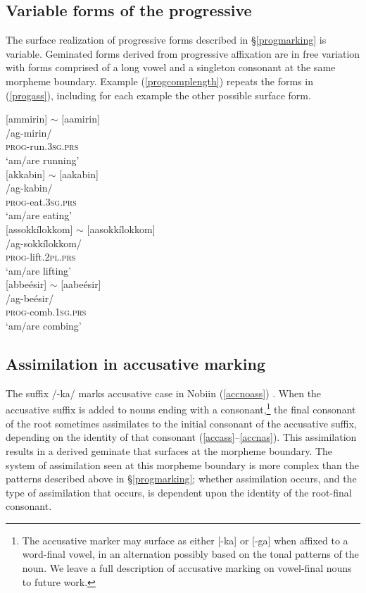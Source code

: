 \documentclass[output=paper]{langscibook}
\begin{document}
\subsection{Variable forms of the progressive}

The surface realization of progressive forms described in \S \ref{progmarking} is variable. Geminated forms derived from progressive affixation are in free variation with forms comprised of a long vowel and a singleton consonant at the same morpheme boundary. Example (\ref{progcomplength}) repeats the forms in (\ref{progass}), including for each example the other possible surface form.
%

\ea \label{progcomplength}
\begin{multicols}{2}
\begin{xlist}
\ex {}[ammirin] $\sim$ [aamirin]\\
/ag-mirin/\\
\textsc{prog}-run.\textsc{3sg.prs}\\
`am/are running'\\
\ex {}[akkabin] $\sim$ [aakabin]\\
/ag-kabin/\\
\textsc{prog}-eat.\textsc{3sg.prs}\\
`am/are eating'\\
\ex {}[assokk\'ilokkom] $\sim$ [aasokkílokkom]\\
/ag-sokk\'ilokkom/\\
\textsc{prog}-lift.\textsc{2pl.prs}\\
`am/are lifting'\\
\ex {}[abbe\'esir] $\sim$ [aabe\'esir]\\
/ag-be\'esir/\\
\textsc{prog}-comb.\textsc{1sg.prs}\\
`am/are combing'\\
\end{xlist}
\end{multicols}
\z

\subsection{Assimilation in accusative marking}
The suffix /-ka/ marks accusative case in Nobiin (\ref{accnoass}) \citep{khalil}. When the accusative suffix is added to nouns ending with a consonant,\footnote{The accusative marker may surface as either [-ka] or [-ga] when affixed to a word-final vowel, in an alternation possibly based on the tonal patterns of the noun. We leave a full description of accusative marking on vowel-final nouns to future work.} 
the final consonant of the root sometimes assimilates to the initial consonant of the accusative suffix, depending on the identity of that consonant (\ref{accass}--\ref{accnas}). This assimilation results in a derived geminate that surfaces at the morpheme boundary. The system of assimilation seen at this morpheme boundary is more complex than the patterns described above in \S \ref{progmarking}; whether assimilation occurs, and the type of assimilation that occurs, is dependent upon the identity of the root-final consonant.\pagebreak
\end{document}
